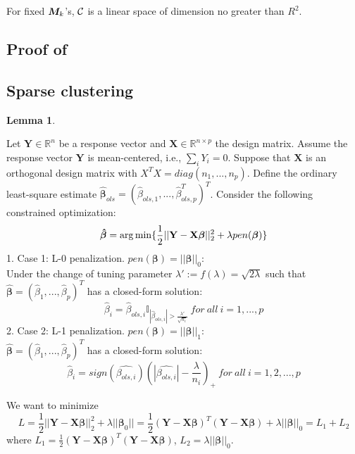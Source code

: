 \documentclass{article}
\newtheorem{lemma}{Lemma}
\begin{document}
\begin{appendices}
For fixed $\bm M_k$'s, $\mathcal{C}$ is a linear space of dimension no greater than $R^2$. 

\subsection{Proof of}

\subsection{Sparse clustering}	
\begin{lemma}
\end{lemma}

Let $\mathbf{Y} \in \mathbb{R}^n$ be a response vector and $\mathbf{X} \in \mathbb{R}^{n\times p}$ the design matrix. Assume the response vector $\mathbf{Y}$ is mean-centered, i.e., $\sum_iY_i=0$. Suppose that $\mathbf{X}$ is an orthogonal design matrix with $X^TX=diag(n_1,...,n_p)$. Define the ordinary least-square estimate $\hat{\bm{\beta}}_{ols} = (\hat{\beta}_{ols,1},...,\hat{\beta}^T_{ols,p})^T$. Consider the following constrained optimization: 
\begin{equation*}
\bm{\hat{\beta}} = \operatorname*{arg\,min}\{\frac{1}{2}||\mathbf{Y}-\mathbf{X}\bm{\beta}||^2_2+\lambda pen(\bm{\beta})\}
\end{equation*}
1. Case 1: L-0 penalization. $pen(\bm{\beta}) = ||\bm{\beta}||_0$:\\
Under the change of tuning parameter $\lambda' := f(\lambda)=\sqrt{2\lambda}$  such that $\bm{\hat{\beta}} = (\hat{\beta}_1,..., \hat{\beta}_p)^T$ has a closed-form solution:
\begin{equation*}
\hat{\beta}_i = \hat{\beta}_{ols,i}\mathbb{I}_{|\hat{\beta}_{ols,i}|>\frac{\lambda'}{\sqrt{n_i}}}\ for\ all\ i=1,...,p
\end{equation*}
2. Case 2: L-1 penalization. $pen(\bm{\beta})= ||\bm{\beta}||_1$:\\
$\bm{\hat{\beta}} = (\hat{\beta}_1,..., \hat{\beta}_p)^T$ has a closed-form solution:
\begin{equation*}
\hat{\beta}_i = sign(\hat{\beta_{ols,i}})(|\hat{\beta_{ols,i}}|-\frac{\lambda}{n_i})_+\ for\ all\ i=1,2,...,p
\end{equation*}
		

	

		We want to minimize
		\begin{equation*}
		L=\frac{1}{2}||\mathbf{Y-X}\bm{\beta}||^2_2+\lambda||\bm{\beta}_0||=\frac{1}{2}(\mathbf{Y-X}\bm{\beta})^T(\mathbf{Y-X}\bm{\beta})+\lambda ||\bm{\beta}||_0=L_1+L_2
		\end{equation*} 
		where $L_1=\frac{1}{2}(\mathbf{Y-X}\bm{\beta})^T(\mathbf{Y-X}\bm{\beta})$, $L_2=\lambda ||\bm{\beta}||_0$. 
	

\end{appendices}
\end{document}

